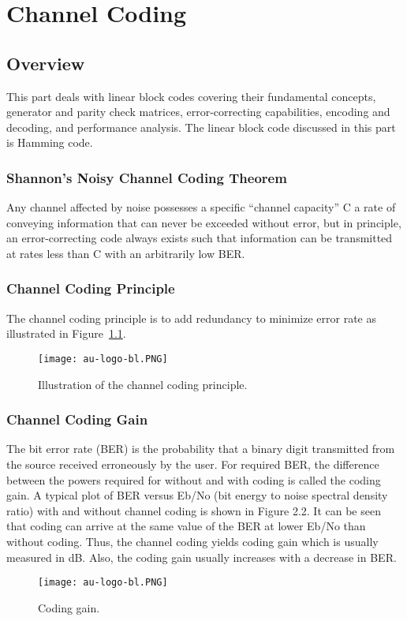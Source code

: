 \chapter{Channel Coding}

\section{Overview}
This part deals with linear block codes covering their fundamental concepts, generator and parity check matrices, error-correcting capabilities, encoding and decoding, and performance analysis. The linear block code discussed in this part is Hamming code.

\subsection{Shannon's Noisy Channel Coding Theorem}
Any channel affected by noise possesses a specific “channel capacity” C a rate of conveying information that can never be exceeded without error, but in principle, an error-correcting code always exists such that information can be transmitted at rates less than C with an arbitrarily low BER.

\subsection{Channel Coding Principle}
The channel coding principle is to add redundancy to minimize error rate as illustrated in Figure~\ref{fig:channel coding principle}.
\begin{figure}[ht]
    \centering
    \texttt{[image: au-logo-bl.PNG]}
    \caption{Illustration of the channel coding principle.}
    \label{fig:channel coding principle}
\end{figure}

\subsection{Channel Coding Gain}
The bit error rate (BER) is the probability that a binary digit transmitted from the source received erroneously by the user. For required BER, the difference between the powers required for without and with coding is called the coding gain. A typical plot of BER versus Eb/No (bit energy to noise spectral density ratio) with and without channel coding is shown in Figure 2.2. It can be seen that coding can arrive at the same value of the BER at lower Eb/No than without coding. Thus, the channel coding yields coding gain which is usually measured in dB. Also, the coding gain usually increases with a decrease in BER.
\begin{figure}[ht]
    \centering
    \texttt{[image: au-logo-bl.PNG]}
    \caption{Coding gain.}
\end{figure}


